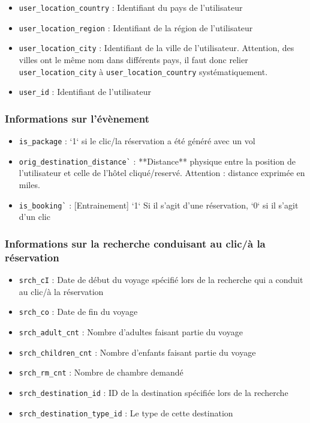 \begin{itemize}[label=$\triangleright$]
	\item \verb|user_location_country|   :  Identifiant du pays de l'utilisateur
	\item \verb|user_location_region|    :  Identifiant de la région de l'utilisateur
	\item \verb|user_location_city|      :  Identifiant de la ville de l'utilisateur. Attention, des villes ont le même nom dans différents pays, il faut donc relier \verb|user_location_city| à \verb|user_location_country| systématiquement.
	\item \verb|user_id|                 :  Identifiant de l'utilisateur
\end{itemize}

\subsubsection{Informations sur l'évènement}

\begin{itemize}[label=$\triangleright$]
	\item \verb|is_package| : `1` si le clic/la réservation a été généré avec un vol
	\item \verb|orig_destination_distance`| : **Distance** physique entre la position de l'utilisateur et celle de l'hôtel cliqué/reservé. Attention : distance exprimée en miles.
	\item \verb|is_booking`| : [Entrainement] `1` Si il s'agit d'une réservation, `0` si il s'agit d'un clic
\end{itemize}

\subsubsection{Informations sur la recherche conduisant au clic/à la réservation}

\begin{itemize}[label=$\triangleright$]
	\item \verb|srch_cI| : Date de début du voyage spécifié lors de la recherche qui a conduit au clic/à la réservation
	\item \verb|srch_co| : Date de fin du voyage
	\item \verb|srch_adult_cnt| : Nombre d'adultes faisant partie du voyage
	\item \verb|srch_children_cnt| : Nombre d'enfants faisant partie du voyage
	\item \verb|srch_rm_cnt| : Nombre de chambre demandé
	\item \verb|srch_destination_id| : ID de la destination spécifiée lors de la recherche
	\item \verb|srch_destination_type_id| : Le type de cette destination
\end{itemize}

